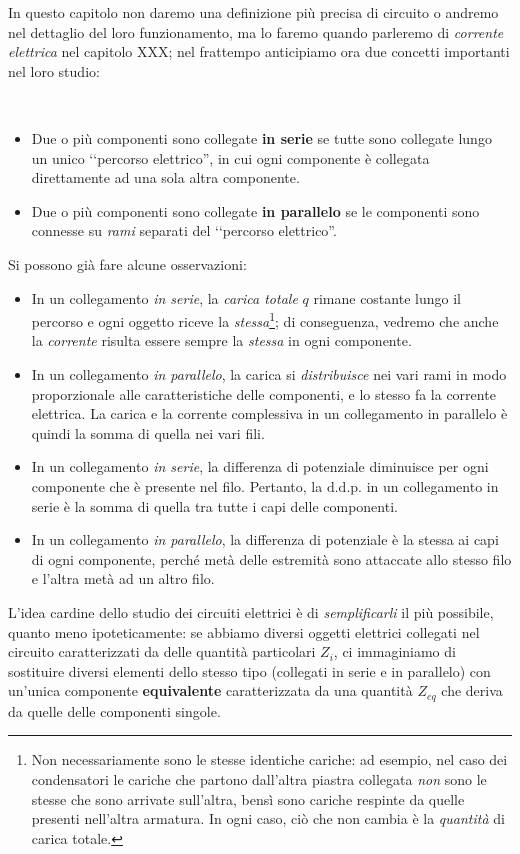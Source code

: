 In questo capitolo non daremo una definizione più precisa di circuito o andremo nel dettaglio del loro funzionamento, ma lo faremo quando parleremo di \textit{corrente elettrica} nel capitolo XXX; nel frattempo anticipiamo ora due concetti importanti nel loro studio:
\begin{define}~
	\begin{itemize}
		\item Due o più componenti sono collegate \textbf{in serie} se tutte sono collegate lungo un unico ‘‘percorso elettrico'', in cui ogni componente è collegata direttamente ad una sola altra componente.
		\item Due o più componenti sono collegate \textbf{in parallelo} se le componenti sono connesse su \textit{rami} separati del ‘‘percorso elettrico''.
	\end{itemize}
\end{define}
Si possono già fare alcune osservazioni:
\begin{itemize}
	\item In un collegamento \textit{in serie}, la \textit{carica totale} $q$ rimane costante lungo il percorso e ogni oggetto riceve la \textit{stessa}\footnote{Non necessariamente sono le stesse identiche cariche: ad esempio, nel caso dei condensatori le cariche che partono dall'altra piastra collegata \textit{non} sono le stesse che sono arrivate sull'altra, bensì sono cariche respinte da quelle presenti nell'altra armatura. In ogni caso, ciò che non cambia è la \textit{quantità} di carica totale.}; di conseguenza, vedremo che anche la \textit{corrente} risulta essere sempre la \textit{stessa} in ogni componente.
	\item In un collegamento \textit{in parallelo}, la carica si \textit{distribuisce} nei vari rami in modo proporzionale alle caratteristiche delle componenti, e lo stesso fa la corrente elettrica. La carica e la corrente complessiva in un collegamento in parallelo è quindi la somma di quella nei vari fili.
	\item In un collegamento \textit{in serie}, la differenza di potenziale diminuisce per ogni componente che è presente nel filo. Pertanto, la $\mathrm{d.d.p.}$ in un collegamento in serie è la somma di quella tra tutte i capi delle componenti.
	\item In un collegamento \textit{in parallelo}, la differenza di potenziale è la stessa ai capi di ogni componente, perché metà delle estremità sono attaccate allo stesso filo e l'altra metà ad un altro filo.
\end{itemize}
L'idea cardine dello studio dei circuiti elettrici è di \textit{semplificarli} il più possibile, quanto meno ipoteticamente: se abbiamo diversi oggetti elettrici collegati nel circuito caratterizzati da delle quantità particolari $Z_i$, ci immaginiamo di sostituire diversi elementi dello stesso tipo (collegati in serie e in parallelo) con un'unica componente \textbf{equivalente} caratterizzata da una quantità $Z_{eq}$ che deriva da quelle delle componenti singole.
